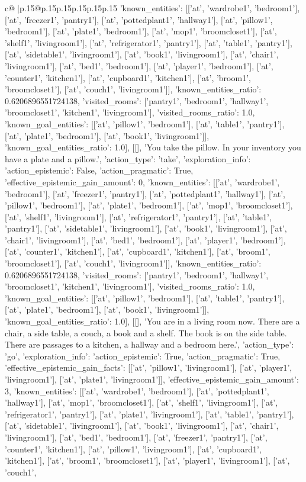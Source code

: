 \documentclass{article}
\begin{document}
{\begin{supertabular}{c@{$\;$}|p{.15\linewidth}@{}p{.15\linewidth}p{.15\linewidth}p{.15\linewidth}p{.15\linewidth}p{.15\linewidth}}
{{{'known_entities': [['at', 'wardrobe1', 'bedroom1'], ['at', 'freezer1', 'pantry1'], ['at', 'pottedplant1', 'hallway1'], ['at', 'pillow1', 'bedroom1'], ['at', 'plate1', 'bedroom1'], ['at', 'mop1', 'broomcloset1'], ['at', 'shelf1', 'livingroom1'], ['at', 'refrigerator1', 'pantry1'], ['at', 'table1', 'pantry1'], ['at', 'sidetable1', 'livingroom1'], ['at', 'book1', 'livingroom1'], ['at', 'chair1', 'livingroom1'], ['at', 'bed1', 'bedroom1'], ['at', 'player1', 'bedroom1'], ['at', 'counter1', 'kitchen1'], ['at', 'cupboard1', 'kitchen1'], ['at', 'broom1', 'broomcloset1'], ['at', 'couch1', 'livingroom1']], 'known_entities_ratio': 0.6206896551724138, 'visited_rooms': ['pantry1', 'bedroom1', 'hallway1', 'broomcloset1', 'kitchen1', 'livingroom1'], 'visited_rooms_ratio': 1.0, 'known_goal_entities': [['at', 'pillow1', 'bedroom1'], ['at', 'table1', 'pantry1'], ['at', 'plate1', 'bedroom1'], ['at', 'book1', 'livingroom1']], 'known_goal_entities_ratio': 1.0}}], [[], 'You take the pillow. In your inventory you have a plate and a pillow.', {'action_type': 'take', 'exploration_info': {'action_epistemic': False, 'action_pragmatic': True, 'effective_epistemic_gain_amount': 0, 'known_entities': [['at', 'wardrobe1', 'bedroom1'], ['at', 'freezer1', 'pantry1'], ['at', 'pottedplant1', 'hallway1'], ['at', 'pillow1', 'bedroom1'], ['at', 'plate1', 'bedroom1'], ['at', 'mop1', 'broomcloset1'], ['at', 'shelf1', 'livingroom1'], ['at', 'refrigerator1', 'pantry1'], ['at', 'table1', 'pantry1'], ['at', 'sidetable1', 'livingroom1'], ['at', 'book1', 'livingroom1'], ['at', 'chair1', 'livingroom1'], ['at', 'bed1', 'bedroom1'], ['at', 'player1', 'bedroom1'], ['at', 'counter1', 'kitchen1'], ['at', 'cupboard1', 'kitchen1'], ['at', 'broom1', 'broomcloset1'], ['at', 'couch1', 'livingroom1']], 'known_entities_ratio': 0.6206896551724138, 'visited_rooms': ['pantry1', 'bedroom1', 'hallway1', 'broomcloset1', 'kitchen1', 'livingroom1'], 'visited_rooms_ratio': 1.0, 'known_goal_entities': [['at', 'pillow1', 'bedroom1'], ['at', 'table1', 'pantry1'], ['at', 'plate1', 'bedroom1'], ['at', 'book1', 'livingroom1']], 'known_goal_entities_ratio': 1.0}}], [[], 'You are in a living room now. There are a chair, a side table, a couch, a book and a shelf. The book is on the side table. There are passages to a kitchen, a hallway and a bedroom here.', {'action_type': 'go', 'exploration_info': {'action_epistemic': True, 'action_pragmatic': True, 'effective_epistemic_gain_facts': [['at', 'pillow1', 'livingroom1'], ['at', 'player1', 'livingroom1'], ['at', 'plate1', 'livingroom1']], 'effective_epistemic_gain_amount': 3, 'known_entities': [['at', 'wardrobe1', 'bedroom1'], ['at', 'pottedplant1', 'hallway1'], ['at', 'mop1', 'broomcloset1'], ['at', 'shelf1', 'livingroom1'], ['at', 'refrigerator1', 'pantry1'], ['at', 'plate1', 'livingroom1'], ['at', 'table1', 'pantry1'], ['at', 'sidetable1', 'livingroom1'], ['at', 'book1', 'livingroom1'], ['at', 'chair1', 'livingroom1'], ['at', 'bed1', 'bedroom1'], ['at', 'freezer1', 'pantry1'], ['at', 'counter1', 'kitchen1'], ['at', 'pillow1', 'livingroom1'], ['at', 'cupboard1', 'kitchen1'], ['at', 'broom1', 'broomcloset1'], ['at', 'player1', 'livingroom1'], ['at', 'couch1', }}}
\end{supertabular}}
\end{document}
